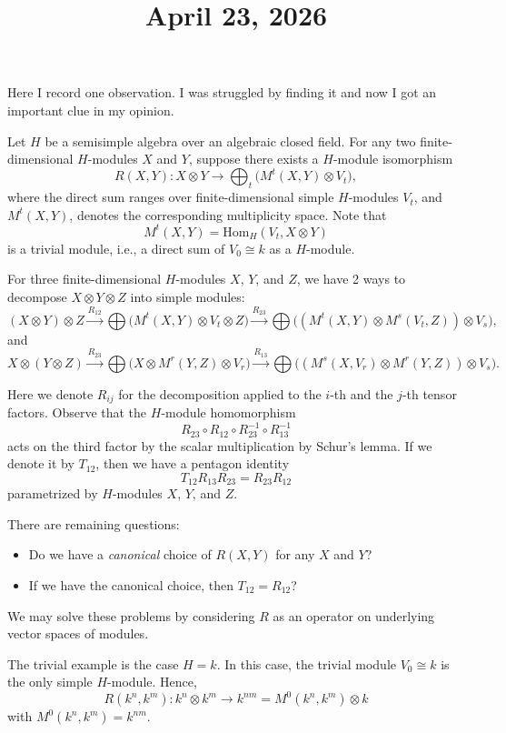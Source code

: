 \documentclass[11pt]{amsart}
\title{April 23, 2026}
\begin{document}
\maketitle

Here I record one observation.
I was struggled by finding it and now I got an important clue in my opinion.

Let $H$ be a semisimple algebra over an algebraic closed field. 
For any two finite-dimensional $H$-modules $X$ and $Y$, suppose there exists a $H$-module isomorphism
\[
R(X, Y): X \otimes Y \longrightarrow \bigoplus_{t} \bigl( M^t(X,Y) \otimes V_t \bigr),
\]
where the direct sum ranges over finite-dimensional simple $H$-modules $V_t$, and  $M^t(X,Y)$, denotes the corresponding multiplicity space.
Note that
\[
M^t(X, Y) = \mathrm{Hom}_H (V_t, X \otimes Y)
\]
is a trivial module, i.e., a direct sum of $V_0 \cong k$ as a $H$-module.

For three finite-dimensional $H$-modules $X$, $Y$, and $Z$, we have 2 ways to decompose $X \otimes Y \otimes Z$ into simple modules:
\[
    (X \otimes Y) \otimes Z \xrightarrow{R_{12}} \bigoplus \bigl( M^t(X, Y) \otimes V_t \otimes Z \bigr) \xrightarrow{R_{23}} \bigoplus \bigl( (M^t(X, Y) \otimes M^s(V_t, Z)) \otimes V_s \bigr),
\]
and
\[
    X \otimes (Y \otimes Z) \xrightarrow{R_{23}} \bigoplus \bigl( X \otimes M^r(Y,Z) \otimes V_r \bigr) \xrightarrow{R_{13}} \bigoplus \bigl( (M^s(X, V_r) \otimes M^r(Y, Z)) \otimes V_s \bigr).
\]

Here we denote $R_{ij}$ for the decomposition applied to the $i$-th and the $j$-th tensor factors.
Observe that the $H$-module homomorphism
\[
R_{23} \circ R_{12} \circ R_{23}^{-1} \circ R_{13}^{-1}
\]
acts on the third factor by the scalar multiplication by Schur's lemma.
If we denote it by $T_{12}$, then we have a pentagon identity
\[
T_{12} R_{13} R_{23} = R_{23} R_{12}
\]
parametrized by $H$-modules $X$, $Y$, and $Z$.

There are remaining questions:
\begin{itemize}
    \item Do we have a \emph{canonical} choice of $R(X,Y)$ for any $X$ and $Y$?
    
    \item If we have the canonical choice, then $T_{12} = R_{12}$?
\end{itemize}

We may solve these problems by considering $R$ as an operator on underlying vector spaces of modules.

\begin{example}
    The trivial example is the case $H=k$.
    In this case, the trivial module $V_0 \cong k$ is the only simple $H$-module.
    Hence,
    \[
        R(k^n, k^m): k^n \otimes k^m \rightarrow k^{nm} = M^0(k^n, k^m) \otimes k
    \]
    with $M^0(k^n, k^m) = k^{nm}$.
\end{example}
\end{document}
